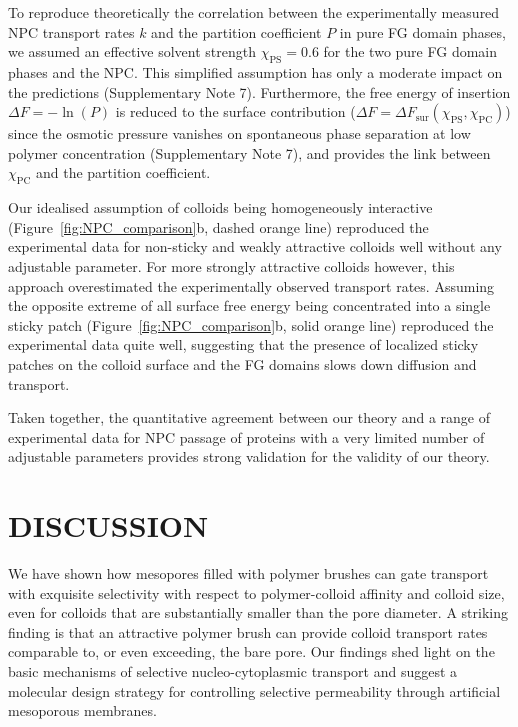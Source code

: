 \documentclass[12pt, a4paper]{article}
\begin{document}
To reproduce theoretically the correlation between the experimentally measured NPC transport rates $k$ and the partition coefficient $P$ in pure FG domain phases, we assumed an effective solvent strength $\chi_\text{PS} = 0.6$ for the two pure FG domain phases and the NPC. This simplified assumption has only a moderate impact on the predictions (Supplementary Note 7).
Furthermore, the free energy of insertion $\Delta F = -\ln(P)$ is reduced to the surface contribution ($\Delta F = \Delta F_\text{sur}\left(\chi_\text{PS},\chi_\text{PC}\right)$) since the osmotic pressure vanishes on spontaneous phase separation at low polymer concentration (Supplementary Note 7), and provides the link between $\chi_\text{PC}$ and the partition coefficient. 

Our idealised assumption of colloids being homogeneously interactive (Figure~\ref{fig:NPC_comparison}b, dashed orange line) reproduced the experimental data for non-sticky and weakly attractive colloids well without any adjustable parameter.
For more strongly attractive colloids however, this approach overestimated the experimentally observed transport rates.
Assuming the opposite extreme of all surface free energy being concentrated into a single sticky patch (Figure~\ref{fig:NPC_comparison}b, solid orange line) reproduced the experimental data quite well, suggesting that the presence of localized sticky patches on the colloid surface and the FG domains slows down diffusion and transport.

Taken together, the quantitative agreement between our theory and a range of experimental data for NPC passage of proteins with a very limited number of adjustable parameters provides strong validation for the validity of our theory.


\section{DISCUSSION}

We have shown how mesopores filled with polymer brushes can gate transport with exquisite selectivity with respect to polymer-colloid affinity and colloid size, even for colloids that are substantially smaller than the pore diameter.
A striking finding is that an attractive polymer brush can provide colloid transport rates comparable to, or even exceeding, the bare pore.
Our findings shed light on the basic mechanisms of selective nucleo-cytoplasmic transport and suggest a molecular design strategy for controlling selective permeability through artificial mesoporous membranes.
\end{document}
